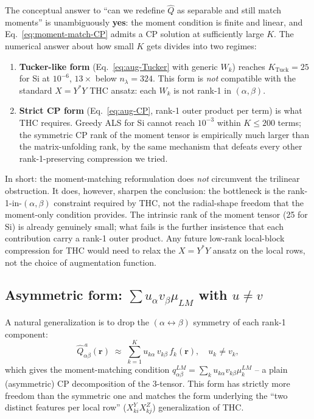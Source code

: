 \documentclass[aps,prb,reprint,superscriptaddress,nofootinbib]{revtex4-2}
\begin{document}
The conceptual answer to ``can we redefine \(\widehat Q\) as separable
and still match moments'' is unambiguously \textbf{yes}: the moment
condition is finite and linear, and Eq.~\eqref{eq:moment-match-CP}
admits a CP solution at sufficiently large \(K\).  The numerical
answer about how small \(K\) gets divides into two regimes:
\begin{enumerate}
\item \textbf{Tucker-like form} (Eq.~\eqref{eq:aug-Tucker} with
generic \(W_k\)) reaches \(K_{\text{Tuck}}=25\) for Si at
\(10^{-6}\), \(13\times\) below \(n_\lambda=324\).  This form is
\emph{not} compatible with the standard \(X=Y^{*}Y\) THC ansatz:
each \(W_k\) is not rank-1 in \((\alpha,\beta)\).
\item \textbf{Strict CP form} (Eq.~\eqref{eq:aug-CP}, rank-1
outer product per term) is what THC requires.  Greedy ALS for Si
cannot reach \(10^{-3}\) within \(K\le 200\) terms; the symmetric
CP rank of the moment tensor is empirically much larger than the
matrix-unfolding rank, by the same mechanism that defeats every
other rank-1-preserving compression we tried.
\end{enumerate}

In short: the moment-matching reformulation does \emph{not} circumvent
the trilinear obstruction.  It does, however, sharpen the conclusion:
the bottleneck is the rank-1-in-\((\alpha,\beta)\) constraint required
by THC, not the radial-shape freedom that the moment-only condition
provides.  The intrinsic rank of the moment tensor (25 for Si) is
already genuinely small; what fails is the further insistence that
each contribution carry a rank-1 outer product.  Any future low-rank
local-block compression for THC would need to relax the
\(X=Y^{*}Y\) ansatz on the local rows, not the choice of augmentation
function.

\subsection{Asymmetric form: \texorpdfstring{$\sum u_\alpha v_\beta \mu_{LM}$}{Sum u v mu} with \texorpdfstring{$u\neq v$}{u != v}}

A natural generalization is to drop the \((\alpha\!\leftrightarrow\!\beta)\)
symmetry of each rank-1 component:
\begin{equation}
\widehat Q^{\,a}_{\alpha\beta}(\mathbf r)
\;\approx\;\sum_{k=1}^K u_{k\alpha}\,v_{k\beta}\,f_k(\mathbf r),
\quad u_k\neq v_k,
\label{eq:aug-CP-asym}
\end{equation}
which gives the moment-matching condition
\(q^{LM}_{\alpha\beta}=\sum_k u_{k\alpha} v_{k\beta} \mu_k^{LM}\) -- a
plain (asymmetric) CP decomposition of the 3-tensor.  This form has
strictly more freedom than the symmetric one and matches the form
underlying the ``two distinct features per local row''
(\(X^Y_{ki}X^Z_{kj}\)) generalization of THC.
\end{document}
